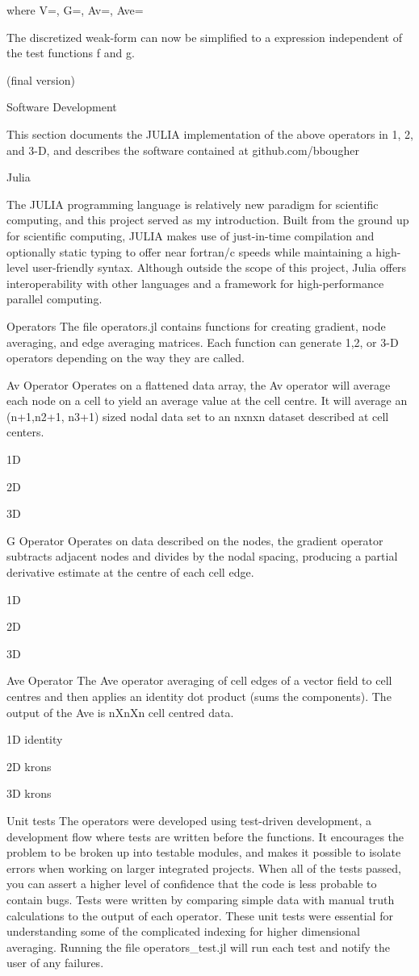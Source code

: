 where V=, G=, Av=, Ave=

The discretized weak-form can now be simplified to a expression independent of the test functions f and g.

(final version)


Software Development

This section documents the JULIA implementation of the above operators in 1, 2, and 3-D, and describes the software contained at github.com/bbougher

	Julia
	
The JULIA programming language is relatively new paradigm for scientific computing, and this project served as my introduction. Built from the ground up for scientific computing, JULIA makes use of just-in-time compilation and optionally static typing to offer near fortran/c speeds while maintaining a high-level user-friendly syntax. Although outside the scope of this project, Julia offers interoperability with other languages and a framework for high-performance parallel computing.
	
	Operators
The file operators.jl contains functions for creating gradient, node averaging, and edge averaging matrices. Each function can generate 1,2, or 3-D operators depending on the way they are called. 

Av Operator
Operates on a flattened data array, the Av operator will average each node on a cell to yield an average value at the cell centre. It will average an (n+1,n2+1, n3+1) sized nodal data set to an nxnxn dataset described at cell centers.

1D

2D

3D

G Operator
Operates on data described on the nodes, the gradient operator subtracts adjacent nodes and divides by the nodal spacing, producing a partial derivative estimate at the centre of each cell edge. 

1D

2D

3D

Ave Operator
The Ave operator averaging of cell edges of a vector field to cell centres and then applies an identity dot product (sums the components). The output of the Ave is nXnXn cell centred data.

1D
identity

2D
krons

3D
krons
	

	Unit tests
The operators were developed using test-driven development, a development flow where tests are written before the functions. It encourages the problem to be broken up into testable modules, and makes it possible to isolate errors when working on larger integrated projects. When all of the tests passed, you can assert a higher level of confidence that the code is less probable to contain bugs. Tests were written by comparing simple data with manual truth calculations to the output of each operator. These unit tests were essential for understanding some of the complicated indexing for higher dimensional averaging. Running the file operators_test.jl will run each test and notify the user of any failures.
	

